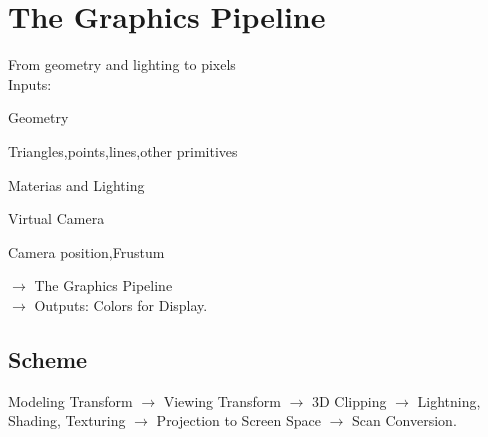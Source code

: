 \chapter{The Graphics Pipeline}
From geometry and lighting to pixels\\
Inputs:\\
\begin{enumerate*}[label=\protect\circled{\arabic*},itemjoin=]
	\item Geometry\\
		\begin{itemize*}[label=\colorbullet,itemjoin=]
			\item Triangles,points,lines,other primitives\\
		\end{itemize*}
	\item Materias and Lighting\\
	\item Virtual Camera\\
		\begin{itemize*}[label=\colorbullet,itemjoin=]
			\item Camera position,Frustum\\
		\end{itemize*}
\end{enumerate*}
$\to$ The Graphics Pipeline \\$\to$ Outputs: Colors for Display.
\section{Scheme}
Modeling Transform $\to$ Viewing Transform $\to$ 3D Clipping $\to$ Lightning, Shading, Texturing $\to$ Projection to Screen Space $\to$ Scan Conversion.
